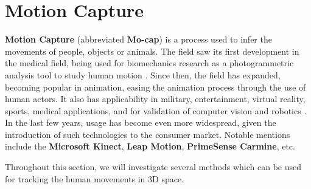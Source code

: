 \documentclass[12p,a4paper]{report}
\begin{document}
\section{Motion Capture} 
\textbf{Motion Capture} (abbreviated \textbf{Mo-cap}) is a process used to infer the movements of people, objects or animals. The field saw its first development in the medical field, being used for biomechanics research as a photogrammetric analysis tool to study human motion \cite{mocap}. Since then, the field has expanded, becoming popular in animation, easing the animation process through the use of human actors. It also has applicability in military, entertainment, virtual reality, sports, medical applications, and for validation of computer vision and robotics \cite{mocapapp}. \\

In the last few years, usage has become even more widespread, given the introduction of such technologies to the consumer market. Notable mentions include the \textbf{Microsoft Kinect}, \textbf{Leap Motion}, \textbf{PrimeSense Carmine}, etc.

Throughout this section, we will investigate several methods which can be used for tracking the human movements in 3D space.

\newpage
\end{document}

